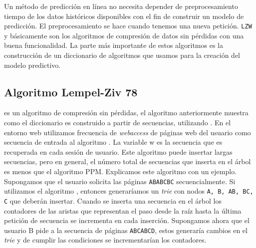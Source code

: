 Un método de predicción en línea no necesita depender de preprocesamiento tiempo de los datos históricos disponibles con el fin de construir un modelo de predicción. El preprocesamiento se hace cuando tenemos una nueva petición. \texttt{LZW} y \lzSieteOcho básicamente son los algoritmos de compresión de datos sin pérdidas con una buena funcionalidad. La parte más importante de estos algoritmos es la construcción de un diccionario de algoritmos que usamos para la creación del modelo predictivo. 






















\uncm
\subsection{Algoritmo Lempel-Ziv 78}







\lzSieteOcho es un algoritmo de compresión sin pérdidas, el algoritmo anteriormente muestra  como el diccionario es construido  a partir de secuencias, utilizando \lzSieteOcho. En el entorno web utilizamos frecuencia de \emph{webaccess} de páginas web del usuario como secuencia de entrada al algoritmo \lzSieteOcho. La variable w es la secuencia que es recuperada en cada sesión de usuario. Este algoritmo puede insertar largas secuencias, pero en general, el número total de secuencias que inserta en el árbol es menos que el algoritmo PPM. Explicamos este algoritmo con un ejemplo. Supongamos que el usuario solicita las páginas \texttt{ABABCBC} secuencialmente. Si utilizamos el algoritmo \lzSieteOcho, entonces generaríamos un \emph{trie} con nodos  \texttt{A, B, AB, BC, C} que deberán insertar. 
Cuando se inserta una secuencia en el árbol los contadores de las aristas que representan el paso desde la raíz hasta la última petición de secuencia se incrementa en cada inserción. Supongamos ahora que el usuario B pide a la secuencia de páginas \texttt{ABCABCD}, estos generaría cambios en el \emph{trie} y de cumplir las condiciones se incrementarían los contadores. 

